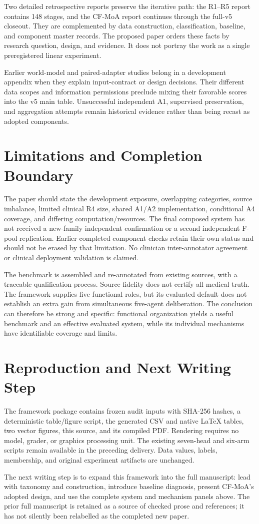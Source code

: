 \documentclass[11pt,a4paper]{article}
\begin{document}
Two detailed retrospective reports preserve the iterative path: the R1--R5 report contains 148 stages, and the CF-MoA report continues through the full-v5 closeout. They are complemented by data construction, classification, baseline, and component master records. The proposed paper orders these facts by research question, design, and evidence. It does not portray the work as a single preregistered linear experiment.

Earlier world-model and paired-adapter studies belong in a development appendix when they explain input-contract or design decisions. Their different data scopes and information permissions preclude mixing their favorable scores into the v5 main table. Unsuccessful independent A1, supervised preservation, and aggregation attempts remain historical evidence rather than being recast as adopted components.

\section{Limitations and Completion Boundary}
The paper should state the development exposure, overlapping categories, source imbalance, limited clinical R4 size, shared A1/A2 implementation, conditional A4 coverage, and differing computation/resources. The final composed system has not received a new-family independent confirmation or a second independent F-pool replication. Earlier completed component checks retain their own status and should not be erased by that limitation. No clinician inter-annotator agreement or clinical deployment validation is claimed.

The benchmark is assembled and re-annotated from existing sources, with a traceable qualification process. Source fidelity does not certify all medical truth. The framework supplies five functional roles, but its evaluated default does not establish an extra gain from simultaneous five-agent deliberation. The conclusion can therefore be strong and specific: functional organization yields a useful benchmark and an effective evaluated system, while its individual mechanisms have identifiable coverage and limits.

\section{Reproduction and Next Writing Step}
The framework package contains frozen audit inputs with SHA-256 hashes, a deterministic table/figure script, the generated CSV and native LaTeX tables, two vector figures, this source, and its compiled PDF. Rendering requires no model, grader, or graphics processing unit. The existing seven-head and six-arm scripts remain available in the preceding delivery. Data values, labels, membership, and original experiment artifacts are unchanged.

The next writing step is to expand this framework into the full manuscript: lead with taxonomy and construction, introduce baseline diagnosis, present CF-MoA's adopted design, and use the complete system and mechanism panels above. The prior full manuscript is retained as a source of checked prose and references; it has not silently been relabelled as the completed new paper.



\end{document}
